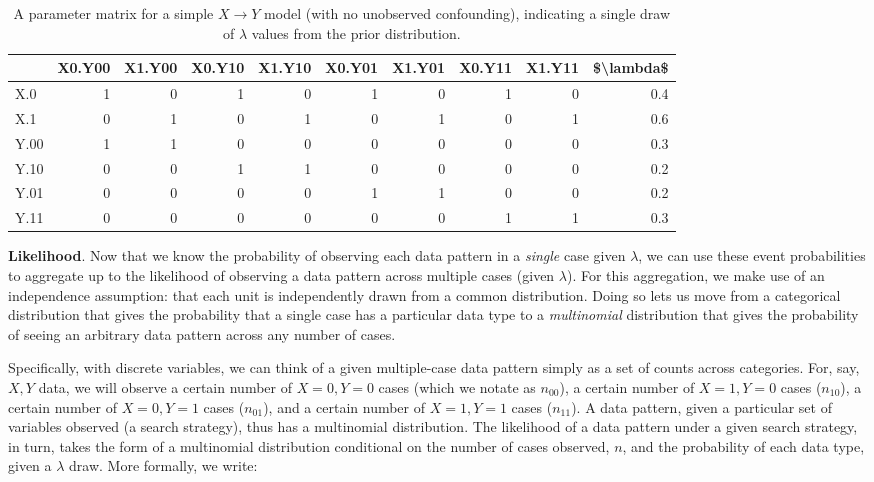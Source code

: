 \documentclass[
  12pt,
]{book}
\begin{document}
\begin{table}

\caption{\label{tab:parammmatrixmix}A parameter matrix for a simple $X \rightarrow Y$ model (with no unobserved confounding), indicating a single draw of $\lambda$ values from the prior distribution.}
\centering
\begin{tabular}[t]{l|r|r|r|r|r|r|r|r|r}
\hline
  & X0.Y00 & X1.Y00 & X0.Y10 & X1.Y10 & X0.Y01 & X1.Y01 & X0.Y11 & X1.Y11 & \$\textbackslash{}lambda\$\\
\hline
X.0 & 1 & 0 & 1 & 0 & 1 & 0 & 1 & 0 & 0.4\\
\hline
X.1 & 0 & 1 & 0 & 1 & 0 & 1 & 0 & 1 & 0.6\\
\hline
Y.00 & 1 & 1 & 0 & 0 & 0 & 0 & 0 & 0 & 0.3\\
\hline
Y.10 & 0 & 0 & 1 & 1 & 0 & 0 & 0 & 0 & 0.2\\
\hline
Y.01 & 0 & 0 & 0 & 0 & 1 & 1 & 0 & 0 & 0.2\\
\hline
Y.11 & 0 & 0 & 0 & 0 & 0 & 0 & 1 & 1 & 0.3\\
\hline
\end{tabular}
\end{table}

\textbf{Likelihood}. Now that we know the probability of observing each data pattern in a \emph{single} case given \(\lambda\), we can use these event probabilities to aggregate up to the likelihood of observing a data pattern across multiple cases (given \(\lambda\)). For this aggregation, we make use of an independence assumption: that each unit is independently drawn from a common distribution. Doing so lets us move from a categorical distribution that gives the probability that a single case has a particular data type to a \emph{multinomial} distribution that gives the probability of seeing an arbitrary data pattern across any number of cases.

Specifically, with discrete variables, we can think of a given multiple-case data pattern simply as a set of counts across categories. For, say, \(X, Y\) data, we will observe a certain number of \(X=0, Y=0\) cases (which we notate as \(n_{00}\)), a certain number of \(X=1, Y=0\) cases (\(n_{10}\)), a certain number of \(X=0, Y=1\) cases (\(n_{01}\)), and a certain number of \(X=1, Y=1\) cases (\(n_{11}\)). A data pattern, given a particular set of variables observed (a search strategy), thus has a multinomial distribution. The likelihood of a data pattern under a given search strategy, in turn, takes the form of a multinomial distribution conditional on the number of cases observed, \(n\), and the probability of each data type, given a \(\lambda\) draw. More formally, we write:
\end{document}
